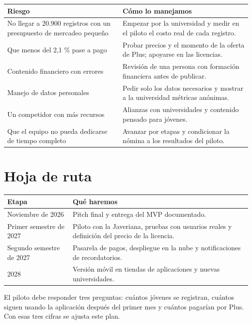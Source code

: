 \documentclass[11pt,a4paper]{article}
\begin{document}
\begin{tabularx}{\textwidth}{Y Y}
  \toprule
  \textbf{Riesgo} & \textbf{Cómo lo manejamos} \\
  \midrule
  No llegar a 20.900 registros con un presupuesto de mercadeo pequeño & Empezar por la universidad y medir en el piloto el costo real de cada registro. \\
  Que menos del 2,1 \% pase a pago & Probar precios y el momento de la oferta de Plus; apoyarse en las licencias. \\
  Contenido financiero con errores & Revisión de una persona con formación financiera antes de publicar. \\
  Manejo de datos personales & Pedir solo los datos necesarios y mostrar a la universidad métricas anónimas. \\
  Un competidor con más recursos & Alianzas con universidades y contenido pensado para jóvenes. \\
  Que el equipo no pueda dedicarse de tiempo completo & Avanzar por etapas y condicionar la nómina a los resultados del piloto. \\
  \bottomrule
\end{tabularx}

\section{Hoja de ruta}

\begin{tabularx}{\textwidth}{P{4.2cm} Y}
  \toprule
  \textbf{Etapa} & \textbf{Qué haremos} \\
  \midrule
  Noviembre de 2026 & Pitch final y entrega del MVP documentado. \\
  Primer semestre de 2027 & Piloto con la Javeriana, pruebas con usuarios reales y definición del precio de la licencia. \\
  Segundo semestre de 2027 & Pasarela de pagos, despliegue en la nube y notificaciones de recordatorios. \\
  2028 & Versión móvil en tiendas de aplicaciones y nuevas universidades. \\
  \bottomrule
\end{tabularx}

El piloto debe responder tres preguntas: cuántos jóvenes se registran, cuántos siguen usando la aplicación después del primer mes y cuántos pagarían por Plus. Con esas tres cifras se ajusta este plan.

\end{document}
